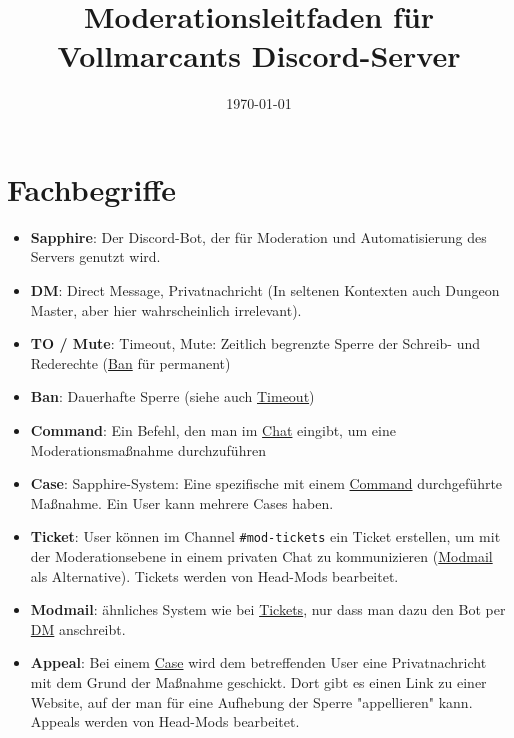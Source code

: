 \documentclass[a4paper,12pt]{article}
\title{Moderationsleitfaden für Vollmarcants Discord-Server}
\author{}
\date{\today}
\begin{document}
\maketitle

\tableofcontents
\newpage

\section{Fachbegriffe}
\label{sec:fachbegriffe}
\begin{itemize}
    \item \textbf{Sapphire}\hypertarget{term:sapphire}{}: Der Discord-Bot, der für Moderation und Automatisierung des Servers genutzt wird.  
    \item \textbf{DM}\hypertarget{term:dm}{}: Direct Message, Privatnachricht (In seltenen Kontexten auch Dungeon Master, aber hier wahrscheinlich irrelevant).
    \item \textbf{TO / Mute}\hypertarget{term:to}{}: Timeout, Mute: Zeitlich begrenzte Sperre der Schreib- und Rederechte (\hyperlink{term:ban}{Ban} für permanent)
    \item \textbf{Ban}\hypertarget{term:ban}{}: Dauerhafte Sperre (siehe auch \hyperlink{term:to}{Timeout})
    \item \textbf{Command}\hypertarget{term:command}{}: Ein Befehl, den man im \hyperlink{term:chat}{Chat} eingibt, um eine Moderationsmaßnahme durchzuführen
    \item \textbf{Case}\hypertarget{term:case}{}: Sapphire-System: Eine spezifische mit einem \hyperlink{term:command}{Command} durchgeführte Maßnahme. Ein User kann mehrere Cases haben.
    \item \textbf{Ticket}\hypertarget{term:ticket}{}: User können im Channel \texttt{\#mod-tickets} ein Ticket erstellen, um mit der Moderationsebene in einem privaten Chat zu kommunizieren (\hyperlink{term:modmail}{Modmail} als Alternative). Tickets werden von Head-Mods bearbeitet.
    \item \textbf{Modmail}\hypertarget{term:modmail}{}: ähnliches System wie bei \hyperlink{term:ticket}{Tickets}, nur dass man dazu den Bot per \hyperlink{term:dm}{DM} anschreibt.
    \item \textbf{Appeal}\hypertarget{term:appeal}{}: Bei einem \hyperlink{term:case}{Case} wird dem betreffenden User eine Privatnachricht mit dem Grund der Maßnahme geschickt. Dort gibt es einen Link zu einer Website, auf der man für eine Aufhebung der Sperre "appellieren" kann. Appeals werden von Head-Mods bearbeitet.

\end{itemize}
\end{document}
